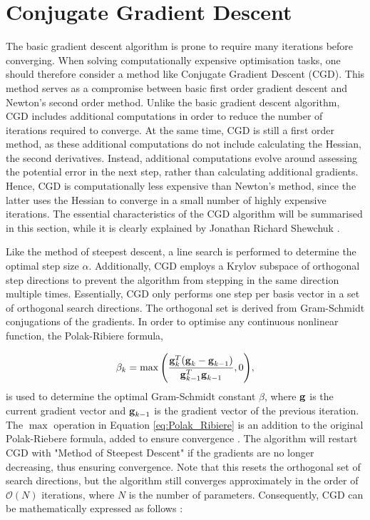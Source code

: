 \section{Conjugate Gradient Descent}\label{sec:theory_CGD}
\noindent
The basic gradient descent algorithm is prone to require many iterations before converging.
When solving computationally expensive optimisation tasks,
one should therefore consider a method like Conjugate Gradient Descent (CGD).
This method serves as a compromise between basic first order gradient descent and Newton's second order method.
Unlike the basic gradient descent algorithm, CGD includes additional computations in order to reduce the number of iterations required to converge.
At the same time, CGD is still a first order method, as these additional computations do not include calculating the Hessian, the second derivatives.
Instead, additional computations evolve around assessing the potential error in the next step, rather than calculating additional gradients.
Hence, CGD is computationally less expensive than Newton's method, since
the latter uses the Hessian to converge in a small number of highly expensive iterations.
The essential characteristics of the CGD algorithm will be summarised in this section, while it is clearly explained by Jonathan Richard Shewchuk \cite{shewchuk1994introduction}.

Like the method of steepest descent, a line search is performed to determine the optimal step size $\alpha$.
Additionally, CGD employs a Krylov subspace of orthogonal step directions to prevent the algorithm from stepping in the same direction multiple times.
Essentially, CGD only performs one step per basis vector in a set of orthogonal search directions.
The orthogonal set is derived from Gram-Schmidt conjugations of the gradients.
In order to optimise any continuous nonlinear function, the Polak-Ribiere formula,

\begin{equation}\label{eq:Polak_Ribiere}
    \beta_{k} = \max{ \left( \frac{\bm{\mathrm{g}}^T_{k}(\bm{\mathrm{g}}_{k} - \bm{\mathrm{g}}_{k-1})}{\bm{\mathrm{g}}^T_{k-1} \bm{\mathrm{g}}_{k-1}}, 0 \right) },
\end{equation}
\noindent
is used to determine the optimal Gram-Schmidt constant $\beta$,
where $\bm{\mathrm{g}}$ is the current gradient vector and $\bm{\mathrm{g}}_{k-1}$ is the gradient vector of the previous iteration.
The $\max$ operation in Equation \eqref{eq:Polak_Ribiere} is an addition to the original Polak-Riebere formula, added to ensure convergence \cite{shewchuk1994introduction}.
The algorithm will restart CGD with "Method of Steepest Descent" if the gradients are no longer decreasing, thus ensuring convergence.
Note that this resets the orthogonal set of search directions, but the algorithm still converges approximately in the order of $\mathcal{O}(N)$ iterations, where $N$ is the number of parameters.
Consequently, CGD can be mathematically expressed as follows \cite{shewchuk1994introduction}:


